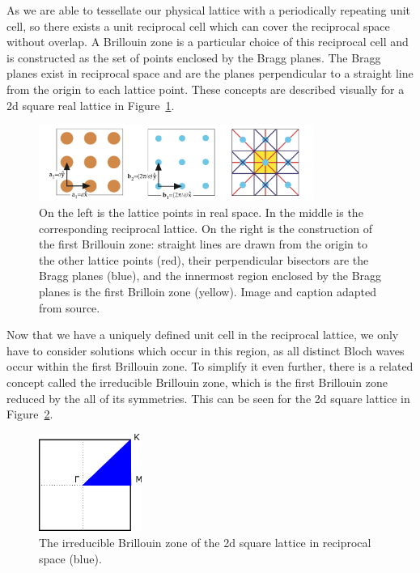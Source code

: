 As we are able to tessellate our physical lattice with a periodically repeating
unit cell, so there exists a unit reciprocal cell which can cover the
reciprocal space without overlap. A Brillouin zone is a particular choice of
this reciprocal cell and is constructed as the set of points enclosed by the
Bragg planes. The Bragg planes exist in reciprocal space and are the planes
perpendicular to a straight line from the origin to each lattice point. These
concepts are described visually for a 2d square real lattice in
Figure~\ref{fig:bzonesq}.

\begin{figure}[!h]
\centering
\includegraphics[width=0.8\textwidth]{imgs/bzonesq.png}
\caption{\label{fig:bzonesq} On the left is the lattice points in real space.
    In the middle is the corresponding reciprocal lattice. On the right is the
    construction of the first Brillouin zone: straight lines are drawn from the
    origin to the other lattice points (red), their perpendicular bisectors are
    the Bragg planes (blue), and the innermost region enclosed by the Bragg
    planes is the first Brilloin zone (yellow). Image and caption adapted from
    source.\cite{MITnp}}
\end{figure}

Now that we have a uniquely defined unit cell in the reciprocal lattice, we
only have to consider solutions which occur in this region, as all distinct
Bloch waves occur within the first Brillouin zone. To simplify it even further,
there is a related concept called the irreducible Brillouin zone, which is the
first Brillouin zone reduced by the all of its symmetries. This can be seen for
the 2d square lattice in Figure~\ref{fig:ibzonesq}.

\begin{figure}[!h]
\centering
\includegraphics[width=0.3\textwidth]{imgs/sqibz.png}
\caption{\label{fig:ibzonesq} The irreducible Brillouin zone of the 2d square
    lattice in reciprocal space (blue).}
\end{figure}

